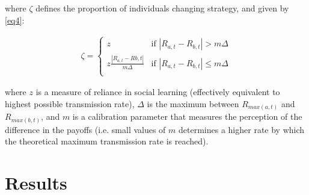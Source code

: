 \documentclass[review,authoryear]{elsarticle}
\begin{document}
where $\zeta$ defines the proportion of individuals changing strategy, and given by \eqref{eq4}:

\begin{equation}
\begin{aligned}
\label{eq4}
\zeta = 
\begin{cases}
z& \text{if }|R_{a,t}-R_{b,t}| > m\Delta\\
z\frac{|R_{a,t}-R{b,t}|}{m\Delta}& \text{if }|R_{a,t}-R_{b,t}| \leq m\Delta\\
\end{cases}
\end{aligned}
\end{equation}

where $z$ is a measure of reliance in social learning (effectively equivalent to highest possible transmission rate), $\Delta$ is the maximum between $R_{max(a,t)}$ and $R_{max(b,t)}$, and $m$ is a calibration parameter that measures the perception of the difference in the payoffs (i.e. small values of $m$ determines a higher rate by which the theoretical maximum transmission rate is reached). 

\section{Results}


\end{document}
